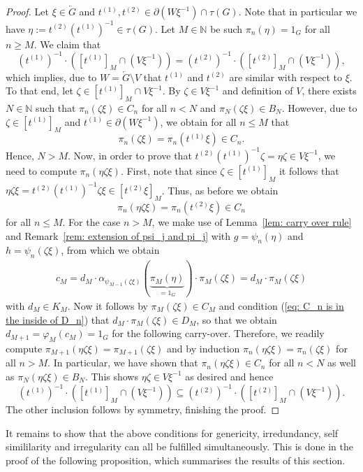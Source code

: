 \documentclass[titlepage,reqno,10pt]{amsart}
\theoremstyle{definition}
\def\N{{\mathbb N}}
\newcommand{\tm}{\subseteq}
\newcommand{\kl}{\left(}
\newcommand{\kr}{\right)}
\begin{document}
\begin{proof}
Let $\xi \in \overleftarrow{G}$ and $t^{(1)},t^{(2)} \in \partial(W\xi^{-1})\cap \tau(G)$.
Note that in particular we have $\eta:= t^{(2)}(t^{(1)})^{-1}\in \tau(G)$.
Let $M\in\N$ be such $\pi_n(\eta) = 1_G$ for all $n\geq M$.
We claim that 
$$ (t^{(1)})^{-1}\cdot\kl[t^{(1)}]_M \cap (V\xi^{-1})\kr  = (t^{(2)})^{-1}\cdot\kl[t^{(2)}]_M \cap (V\xi^{-1})\kr,$$
which implies, due to $W=\overleftarrow{G}\setminus V$ that $t^{(1)}$ and $t^{(2)}$ are similar with respect to $\xi$.
To that end, let $\zeta \in [t^{(1)}]_M\cap V\xi^{-1}$.
By $\zeta \in V\xi^{-1}$ and definition of $V$, there exists $N\in\N$ such that $\pi_n(\zeta\xi) \in C_n$ for all $n<N$ and $\pi_N(\zeta\xi) \in B_N$.
However, due to $\zeta \in [t^{(1)}]_M$ and $t^{(1)} \in \partial (W \xi^{-1})$, we obtain for all $n\leq M$ that
$$ \pi_n(\zeta\xi) = \pi_n( t^{(1)}\xi) \in C_n.$$
Hence, $N>M$.
Now, in order to prove that $ t^{(2)}(t^{(1)})^{-1}\zeta =\eta\zeta\in V \xi^{-1} $, we need to compute $\pi_n(\eta\zeta\xi)$.
First, note that since $\zeta \in [t^{(1)}]_M$ it follows that $\eta\zeta\xi= t^{(2)}(t^{(1)})^{-1}\zeta\xi \in [t^{(2)}\xi]_M$.
Thus, as before we obtain 
$$ \pi_n(\eta\zeta\xi) = \pi_n(t^{(2)}\xi) \in C_n$$
for all $n\leq M$.
For the case $n>M$, we make use of Lemma~\ref{lem: carry over rule} and Remark~\ref{rem: extension of psi_j and pi_j} with $g=\psi_n(\eta)$ and $h=\psi_n(\zeta\xi)$, from which we obtain 
\begin{align*}
    c_M =   d_M\cdot \alpha_{\psi_{M-1}(\zeta\xi)}(\underbrace{\pi_M(\eta)}_{=1_G})\cdot \pi_M(\zeta\xi) 
    = d_M\cdot \pi_M(\zeta\xi) 
\end{align*}
with $d_M \in K_M$.
Now it follows by $\pi_M(\zeta\xi)\in C_M$ and condition (\ref{eq: C_n is in the inside of D_n}) that $d_M\cdot \pi_M(\zeta\xi)  \in D_M$, so that we obtain $d_{M+1}= \varphi_M(c_M)= 1_G$ for the following carry-over.
Therefore, we readily compute $\pi_{M+1}(\eta\zeta\xi) = \pi_{M+1}(\zeta\xi)$ and by induction $\pi_n(\eta\zeta\xi) = \pi_n(\zeta\xi)$ for all $n>M$.
In particular, we have shown that $\pi_n(\eta\zeta\xi) \in C_n$ for all $n<N$ as well as $\pi_N(\eta\zeta\xi) \in B_N$.
This shows $\eta \zeta  \in V\xi^{-1} $ as desired and hence 
$$ (t^{(1)})^{-1}\cdot\kl [t^{(1)}]_M \cap (V\xi^{-1}) \kr   \tm (t^{(2)})^{-1}\cdot\kl [t^{(2)}]_M \cap (V\xi^{-1}) \kr.$$
The other inclusion follows by symmetry, finishing the proof.
\end{proof}

It remains to show that the above conditions for genericity, irredundancy, self simililarity and irregularity can all be fulfilled simultaneously. This is done in the proof of the following proposition, which summarises the results of this section.  
\end{document}
